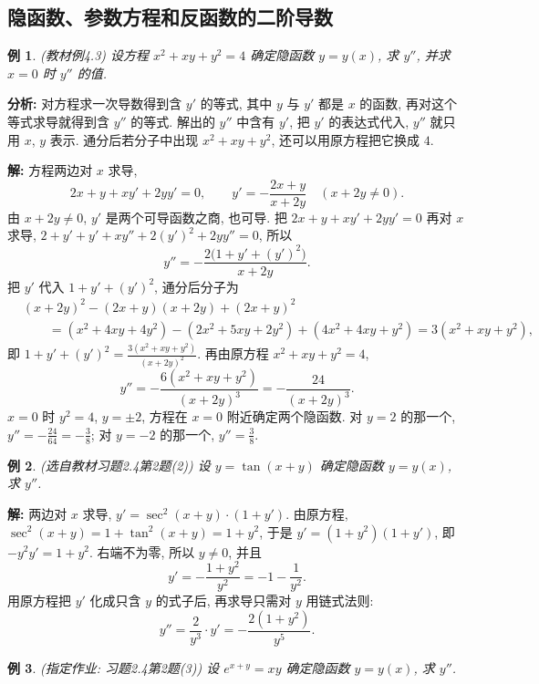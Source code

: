 \documentclass[UTF8,openany]{ctexbook}
\theoremstyle{chinesetextbook}
\newtheorem{example}{例}[section]
\newenvironment{cnsolution}{\par\indent\textbf{解:} \ignorespaces}{\par}
\begin{document}
\subsection{隐函数、参数方程和反函数的二阶导数}
\begin{example}\label{ex:c2-4-3}
\textnormal{(教材例4.3)} 设方程 $x^2+xy+y^2=4$ 确定隐函数 $y=y(x)$, 求 $y''$, 并求 $x=0$ 时 $y''$ 的值.
\end{example}
\par\indent\textbf{分析:} 对方程求一次导数得到含 $y'$ 的等式, 其中 $y$ 与 $y'$ 都是 $x$ 的函数, 再对这个等式求导就得到含 $y''$ 的等式. 解出的 $y''$ 中含有 $y'$, 把 $y'$ 的表达式代入, $y''$ 就只用 $x$, $y$ 表示. 通分后若分子中出现 $x^2+xy+y^2$, 还可以用原方程把它换成 $4$.
\begin{cnsolution}
方程两边对 $x$ 求导,
\[
2x+y+xy'+2yy'=0,\qquad y'=-\frac{2x+y}{x+2y}\quad(x+2y\ne0).
\]
由 $x+2y\ne0$, $y'$ 是两个可导函数之商, 也可导. 把 $2x+y+xy'+2yy'=0$ 再对 $x$ 求导, $2+y'+y'+xy''+2(y')^2+2yy''=0$, 所以
\[
y''=-\frac{2\bigl(1+y'+(y')^2\bigr)}{x+2y}.
\]
把 $y'$ 代入 $1+y'+(y')^2$, 通分后分子为
\[
\begin{aligned}
&(x+2y)^2-(2x+y)(x+2y)+(2x+y)^2\\
&\qquad=(x^2+4xy+4y^2)-(2x^2+5xy+2y^2)+(4x^2+4xy+y^2)=3(x^2+xy+y^2),
\end{aligned}
\]
即 $\displaystyle1+y'+(y')^2=\frac{3(x^2+xy+y^2)}{(x+2y)^2}$. 再由原方程 $x^2+xy+y^2=4$,
\[
y''=-\frac{6(x^2+xy+y^2)}{(x+2y)^3}=-\frac{24}{(x+2y)^3}.
\]
$x=0$ 时 $y^2=4$, $y=\pm2$, 方程在 $x=0$ 附近确定两个隐函数. 对 $y=2$ 的那一个, $\displaystyle y''=-\frac{24}{64}=-\frac38$; 对 $y=-2$ 的那一个, $\displaystyle y''=\frac38$.
\end{cnsolution}
\begin{example}\label{ex:c2-h4-2}
\textnormal{(选自教材习题2.4第2题(2))} 设 $y=\tan(x+y)$ 确定隐函数 $y=y(x)$, 求 $y''$.
\end{example}
\begin{cnsolution}
两边对 $x$ 求导, $y'=\sec^2(x+y)\cdot(1+y')$. 由原方程, $\sec^2(x+y)=1+\tan^2(x+y)=1+y^2$, 于是 $y'=(1+y^2)(1+y')$, 即 $-y^2y'=1+y^2$. 右端不为零, 所以 $y\ne0$, 并且
\[
y'=-\frac{1+y^2}{y^2}=-1-\frac1{y^2}.
\]
用原方程把 $y'$ 化成只含 $y$ 的式子后, 再求导只需对 $y$ 用链式法则:
\[
y''=\frac2{y^3}\cdot y'=-\frac{2(1+y^2)}{y^5}.
\]
\end{cnsolution}
\begin{example}\label{ex:c2-h4-2b}
\textnormal{(指定作业: 习题2.4第2题(3))} 设 $e^{x+y}=xy$ 确定隐函数 $y=y(x)$, 求 $y''$.
\end{example}
\end{document}
